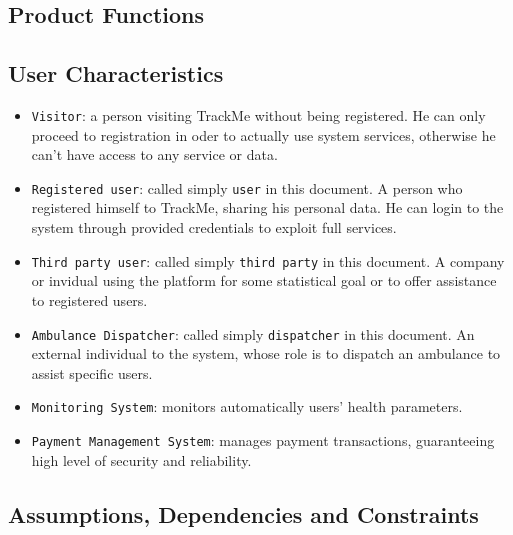 \documentclass[12pt,a4paper]{article}
\begin{document}
		\subsection{Product Functions}
		
		\subsection{User Characteristics}
			\begin{itemize}
				\item \texttt{Visitor}: a person visiting TrackMe without being registered. He can only proceed to registration in oder to actually use system services, otherwise he can't have access to any service or data.
				\item \texttt{Registered user}: called simply \texttt{user} in this document. A person who registered himself to TrackMe, sharing his personal data. He can login to the system through provided credentials to exploit full services.
				\item \texttt{Third party user}: called simply \texttt{third party} in this document. A company or invidual using the platform for some statistical goal or to offer assistance to registered users.
				\item \texttt{Ambulance Dispatcher}: called simply \texttt{dispatcher} in this document. An external individual to the system, whose role is to dispatch an ambulance to assist specific users.
				\item \texttt{Monitoring System}: monitors automatically users' health parameters.
				\item \texttt{Payment Management System}: manages payment transactions, guaranteeing high level of security and reliability.
			\end{itemize}
		
		\subsection{Assumptions, Dependencies and Constraints}
\end{document}

